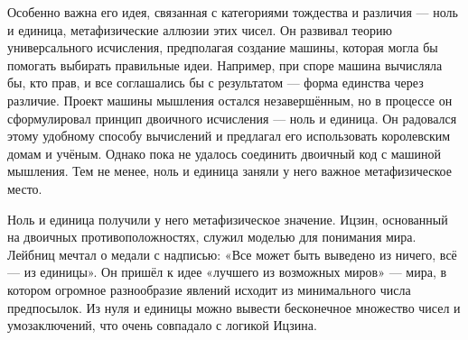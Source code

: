 
Особенно важна его идея, связанная с категориями тождества и различия --- ноль и единица, метафизические аллюзии этих чисел. Он развивал теорию универсального исчисления, предполагая создание машины, которая могла бы помогать выбирать правильные идеи. Например, при споре машина вычисляла бы, кто прав, и все соглашались бы с результатом --- форма единства через различие.
Проект машины мышления остался незавершённым, но в процессе он сформулировал принцип двоичного исчисления --- ноль и единица. Он радовался этому удобному способу вычислений и предлагал его использовать королевским домам и учёным. Однако пока не удалось соединить двоичный код с машиной мышления. Тем не менее, ноль и единица заняли у него важное метафизическое место.


Ноль и единица получили у него метафизическое значение. Ицзин, основанный на двоичных противоположностях, служил моделью для понимания мира. Лейбниц мечтал о медали с надписью: «Все может быть выведено из ничего, всё --- из единицы». Он пришёл к идее «лучшего из возможных миров» --- мира, в котором огромное разнообразие явлений исходит из минимального числа предпосылок. Из нуля и единицы можно вывести бесконечное множество чисел и умозаключений, что очень совпадало с логикой Ицзина.

